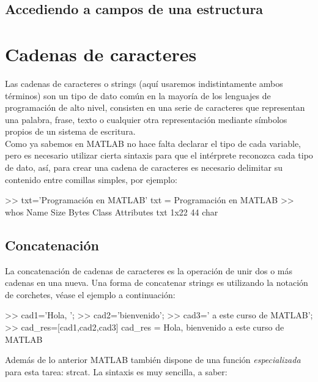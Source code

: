 \subsection{Accediendo a campos de una estructura}\label{accediendo-a-campos-de-una-estructura}

\section{Cadenas de caracteres}\label{cadenas-de-caracteres}

Las cadenas de caracteres o strings (aquí usaremos indistintamente ambos
términos) son un tipo de dato común en la mayoría de los lenguajes de
programación de alto nivel, consisten en una serie de caracteres que
representan una palabra, frase, texto o cualquier otra representación
mediante símbolos propios de un sistema de escritura. \\

Como ya sabemos en MATLAB no hace falta declarar el tipo de cada
variable, pero es necesario utilizar cierta sintaxis para que el
intérprete reconozca cada tipo de dato, así, para crear una cadena de
caracteres es necesario delimitar su contenido entre comillas simples,
por ejemplo:

\begin{matlab}
>> txt='Programación en MATLAB'
txt =
Programación en MATLAB
>> whos
  Name      Size            Bytes  Class    Attributes
  txt       1x22               44  char    
\end{matlab}

\subsection{Concatenación}\label{concatenacion}

La concatenación de cadenas de caracteres es la operación de unir dos o
más cadenas en una nueva. Una forma de concatenar strings es utilizando
la notación de corchetes, véase el ejemplo a continuación:

\begin{matlab}
>> cad1='Hola, ';
>> cad2='bienvenido';
>> cad3=' a este curso de MATLAB';
>> cad_res=[cad1,cad2,cad3]
cad_res =
Hola, bienvenido a este curso de MATLAB
\end{matlab}

Además de lo anterior MATLAB también dispone de una función
\emph{especializada} para esta tarea: strcat. La sintaxis es muy
sencilla, a saber:

